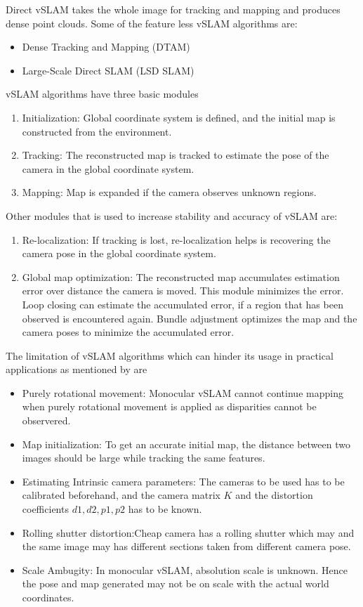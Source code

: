 Direct vSLAM takes the whole image for tracking and mapping and produces dense point clouds. Some of the feature less vSLAM algorithms are:

\begin{itemize}
	\item Dense Tracking and Mapping (DTAM) \cite{6126513}
	\item Large-Scale Direct SLAM (LSD SLAM) \cite{Engel2014LSDSLAMLD}
\end{itemize}

vSLAM algorithms have three basic modules 
\begin{enumerate}
	\item Initialization: Global coordinate system is defined, and the initial map is constructed from the environment.
	\item Tracking: The reconstructed map is tracked to estimate the pose of the camera in the global coordinate system.
	\item Mapping: Map is expanded if the camera observes unknown regions.
\end{enumerate}

Other modules that is used to increase stability and accuracy of vSLAM are:
\begin{enumerate}
	\item Re-localization: If tracking is lost, re-localization helps is recovering the camera pose in the global coordinate system.
	\item Global map optimization: The reconstructed map accumulates estimation error over distance the camera is moved. This module minimizes the error. Loop closing can estimate the accumulated error, if a region that has been observed is encountered again. Bundle adjustment optimizes the map and the camera poses to minimize the accumulated error.
\end{enumerate}


The limitation of vSLAM algorithms which can hinder its usage in practical applications as mentioned by  are

\begin{itemize}
	\item Purely rotational movement: Monocular vSLAM cannot continue mapping when purely rotational movement is applied as disparities cannot be observered.
	\item Map initialization: To get an accurate initial map, the distance between two images should be large while tracking the same features. 
	\item Estimating Intrinsic camera parameters: The cameras to be used has to be calibrated beforehand, and the  camera matrix $K$ and the distortion coefficients $d1, d2, p1, p2$ has to be known.
	\item Rolling shutter distortion:Cheap camera has a rolling shutter which may and the same image may has different sections taken from different camera pose.
	\item Scale Ambugity: In monocular vSLAM, absolution scale is unknown. Hence the pose and map generated may not be on scale with the actual world coordinates.
\end{itemize}




